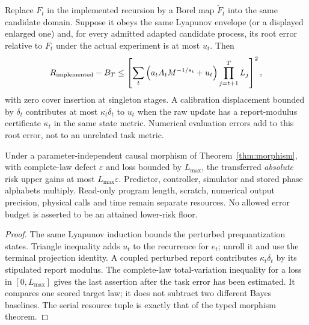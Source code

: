 \begin{corollary}\label{cor:serialerrors}
Replace $F_t$ in the implemented recursion by a Borel map $\widetilde F_t$ into the same candidate domain. Suppose it obeys the same Lyapunov envelope (or a displayed enlarged one) and, for every admitted adapted candidate process, its root error relative to $F_t$ under the actual experiment is at most $u_t$. Then
\begin{equation}\label{eq:serialerrorprofile}
 R_{\rm implemented}-B_T\le
 \left[\sum_t\left(a_tA_tM^{-1/s_t}+u_t\right)
                    \prod_{j=t+1}^TL_j\right]^2,
\end{equation}
with zero cover insertion at singleton stages. A calibration displacement bounded by $\delta_t$ contributes at most $\kappa_t\delta_t$ to $u_t$ when the raw update has a report-modulus certificate $\kappa_t$ in the same state metric. Numerical evaluation errors add to this root error, not to an unrelated task metric.

Under a parameter-independent causal morphism of Theorem~\ref{thm:morphism}, with complete-law defect $\varepsilon$ and loss bounded by $L_{\max}$, the transferred \emph{absolute} risk upper gains at most $L_{\max}\varepsilon$. Predictor, controller, simulator and stored phase alphabets multiply. Read-only program length, scratch, numerical output precision, physical calls and time remain separate resources. No allowed error budget is asserted to be an attained lower-risk floor.
\end{corollary}
\begin{proof}
The same Lyapunov induction bounds the perturbed prequantization states. Triangle inequality adds $u_t$ to the recurrence for $e_t$; unroll it and use the terminal projection identity. A coupled perturbed report contributes $\kappa_t\delta_t$ by its stipulated report modulus. The complete-law total-variation inequality for a loss in $[0,L_{\max}]$ gives the last assertion after the task error has been estimated. It compares one scored target law; it does not subtract two different Bayes baselines. The serial resource tuple is exactly that of the typed morphism theorem.
\end{proof}
